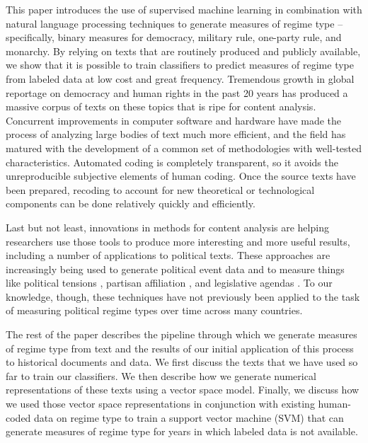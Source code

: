 \documentclass[pdftex,12pt,fullpage,oneside]{amsart}
\begin{document}
This paper introduces the use of supervised machine learning in combination with natural language processing techniques to generate measures of regime type -- specifically, binary measures for democracy, military rule, one-party rule, and monarchy. By relying on texts that are routinely produced and publicly available, we show that it is possible to train classifiers to predict measures of regime type from labeled data at low cost and great frequency. Tremendous growth in global reportage on democracy and human rights in the past 20 years has produced a massive corpus of texts on these topics that is ripe for content analysis. Concurrent improvements in computer software and hardware have made the process of analyzing large bodies of text much more efficient, and the field has matured with the development of a common set of methodologies with well-tested characteristics. Automated coding is completely transparent, so it avoids the unreproducible subjective elements of human coding. Once the source texts have been prepared, recoding to account for new theoretical or technological components can be done relatively quickly and efficiently. 

Last but not least, innovations in methods for content analysis are helping researchers use those tools to produce more interesting and more useful results, including a number of applications to political texts. These approaches are increasingly being used to generate political event data \cite{dorazio:etal:2014,king:lowe:2003,oconnor:etal:2013} and to measure things like political tensions \cite{chadefaux:2014}, partisan affiliation \citep{slapin:proksch:2010,yu:etal:2008}, and legislative agendas \citep{grimmer:2010}. To our knowledge, though, these techniques have not previously been applied to the task of measuring political regime types over time across many countries. 

The rest of the paper describes the pipeline through which we generate measures of regime type from text and the results of our initial application of this process to historical documents and data. We first discuss the texts that we have used so far to train our classifiers. We then describe how we generate numerical representations of these texts using a vector space model. Finally, we discuss how we used those vector space representations in conjunction with existing human-coded data on regime type to train a support vector machine (SVM) that can generate measures of regime type for years in which labeled data is not available.
\end{document}

